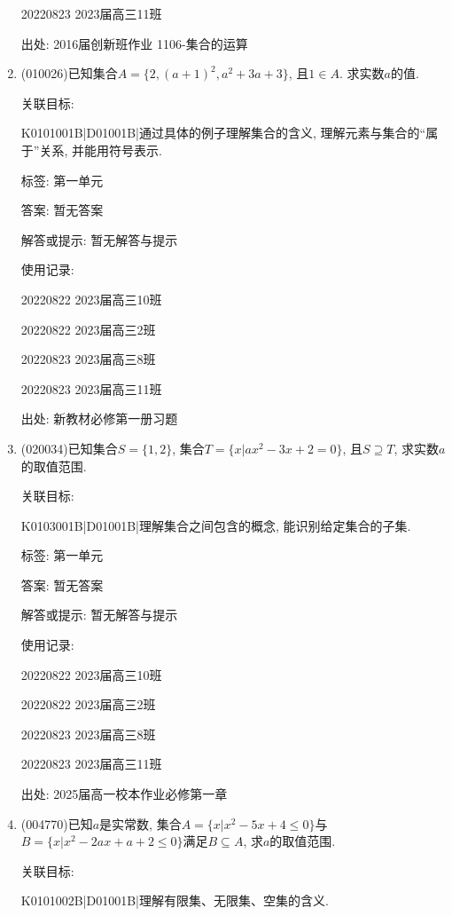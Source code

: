 \documentclass[10pt,a4paper]{article}
\begin{document}
\begin{enumerate}[1.]
20220823	2023届高三11班	


出处: 2016届创新班作业	1106-集合的运算
\item { (010026)}已知集合$A=\{2, (a+1)^2, a^2+3a+3\}$, 且$1\in A$. 求实数$a$的值.


关联目标:

K0101001B|D01001B|通过具体的例子理解集合的含义, 理解元素与集合的``属于''关系, 并能用符号表示.



标签: 第一单元

答案: 暂无答案

解答或提示: 暂无解答与提示

使用记录:

20220822	2023届高三10班	

20220822	2023届高三2班	

20220823	2023届高三8班	

20220823	2023届高三11班	


出处: 新教材必修第一册习题
\item { (020034)}已知集合$S=\{1, 2\}$, 集合$T=\{x|ax^2-3x+2=0\}$, 且$S\supseteq T$, 求实数$a$的取值范围.


关联目标:

K0103001B|D01001B|理解集合之间包含的概念, 能识别给定集合的子集.



标签: 第一单元

答案: 暂无答案

解答或提示: 暂无解答与提示

使用记录:

20220822	2023届高三10班	

20220822	2023届高三2班	

20220823	2023届高三8班	

20220823	2023届高三11班	


出处: 2025届高一校本作业必修第一章
\item { (004770)}已知$a$是实常数, 集合$A=\{x|x^2-5x+4\le 0\}$与$B=\{x|x^2-2ax+a+2\le 0\}$满足$B\subseteq A$, 求$a$的取值范围.


关联目标:

K0101002B|D01001B|理解有限集、无限集、空集的含义.




\end{enumerate}
\end{document}
